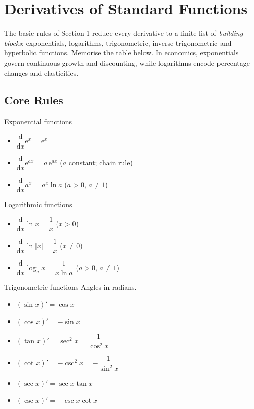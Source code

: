\chapter{Derivatives of Standard Functions}

The basic rules of Section 1 reduce every derivative to a finite list of
\emph{building blocks}: exponentials, logarithms, trigonometric, inverse
trigonometric and hyperbolic functions. Memorise the table below. In
economics, exponentials govern continuous growth and discounting, while
logarithms encode percentage changes and elasticities.

\section{Core Rules}

\begin{rulebox}{Exponential functions}
\begin{itemize}[leftmargin=1.6em,itemsep=0.3ex]
  \item $\dfrac{\mathrm{d}}{\mathrm{d}x}\mathrm{e}^{x}=\mathrm{e}^{x}$
  \item $\dfrac{\mathrm{d}}{\mathrm{d}x}\mathrm{e}^{ax}=a\,\mathrm{e}^{ax}$
        \quad ($a$ constant; chain rule)
  \item $\dfrac{\mathrm{d}}{\mathrm{d}x}a^{x}=a^{x}\ln a$ \quad
        ($a>0$, $a\neq 1$)
\end{itemize}
\end{rulebox}

\begin{rulebox}{Logarithmic functions}
\begin{itemize}[leftmargin=1.6em,itemsep=0.3ex]
  \item $\dfrac{\mathrm{d}}{\mathrm{d}x}\ln x=\dfrac{1}{x}$ \quad ($x>0$)
  \item $\dfrac{\mathrm{d}}{\mathrm{d}x}\ln|x|=\dfrac{1}{x}$ \quad
        ($x\neq 0$)
  \item $\dfrac{\mathrm{d}}{\mathrm{d}x}\log_{a}x=\dfrac{1}{x\ln a}$ \quad
        ($a>0$, $a\neq 1$)
\end{itemize}
\end{rulebox}

\begin{rulebox}{Trigonometric functions}
Angles in radians.
\begin{itemize}[leftmargin=1.6em,itemsep=0.3ex]
  \item $(\sin x)'=\cos x$
  \item $(\cos x)'=-\sin x$
  \item $(\tan x)'=\sec^{2}x=\dfrac{1}{\cos^{2}x}$
  \item $(\cot x)'=-\csc^{2}x=-\dfrac{1}{\sin^{2}x}$
  \item $(\sec x)'=\sec x\tan x$
  \item $(\csc x)'=-\csc x\cot x$
\end{itemize}
\end{rulebox}

